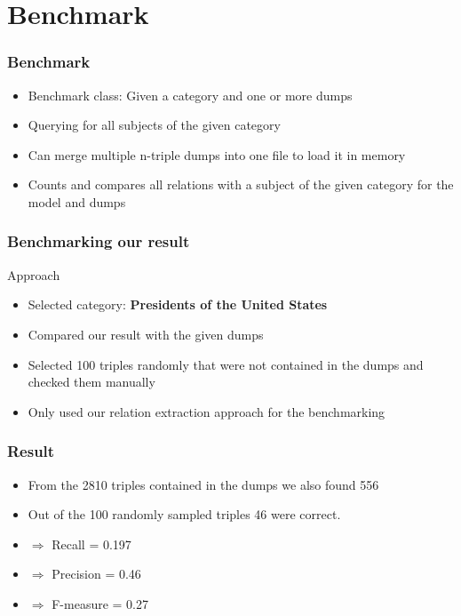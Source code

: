 \documentclass{beamer}
\begin{document}


\section{Benchmark}
\begin{frame}
\frametitle{Benchmark}
\begin{itemize}
	\item Benchmark class: Given a category and one or more dumps
	\item Querying for all subjects of the given category
	\item Can merge multiple n-triple dumps into one file to load it in memory
	\item Counts and compares all relations with a subject of the given category for the model and dumps
\end{itemize}
\end{frame}

\begin{frame}
\frametitle{Benchmarking our result}

\begin{block}{Approach}
	\begin{itemize}
		\item Selected category: \textbf{Presidents of the United States}
		\item Compared our result with the given dumps 
		\item Selected 100 triples randomly that were not contained in the dumps and checked them manually
		\item Only used our relation extraction approach for the benchmarking
	\end{itemize}
\end{block}

\end{frame}


\begin{frame}
\frametitle{Result}
\begin{itemize}
	\item From the 2810 triples contained in the dumps we also found 556 
	\item Out of the 100 randomly sampled triples 46 were correct.
	\item[] $\Rightarrow$ Recall = 0.197
	\item[] $\Rightarrow$ Precision = 0.46
	\item[] $\Rightarrow$ F-measure = 0.27
\end{itemize}

\end{frame}
\end{document}

